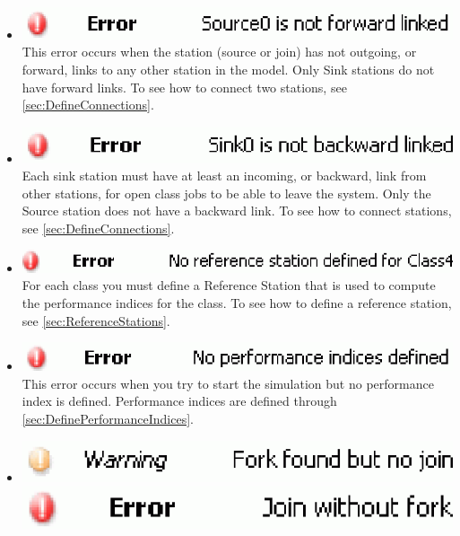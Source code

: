 \begin{itemize}
\item \includegraphics[scale=.5]{img/jsim/1.eps}\\
This error occurs when the station (source or join) has not outgoing, or forward, links to any other station in the model. Only Sink stations do not have forward links.
To see how to connect two stations, see \autoref{sec:DefineConnections}.
\item \includegraphics[scale=.5]{img/jsim/2.eps}\\
Each sink station must have at least an incoming, or backward, link from other stations, for open class jobs to be able to leave the system. Only the Source station does not have a backward link. To see how to connect stations, see \autoref{sec:DefineConnections}.
\item \includegraphics[scale=.5]{img/jsim/3.eps}\\
 For each class you must define a Reference Station that is used to compute the performance indices for the class. To see how to define a reference  station, see \autoref{sec:ReferenceStations}.
\item \includegraphics[scale=.5]{img/jsim/4.eps}\\
This error occurs when you try to start the simulation but no performance index is defined. Performance indices are defined through \autoref{sec:DefinePerformanceIndices}.
\item \includegraphics[scale=.5]{img/jsim/5.eps}\\
\includegraphics[scale=.5]{img/jsim/9.eps}\\

\end{itemize}
